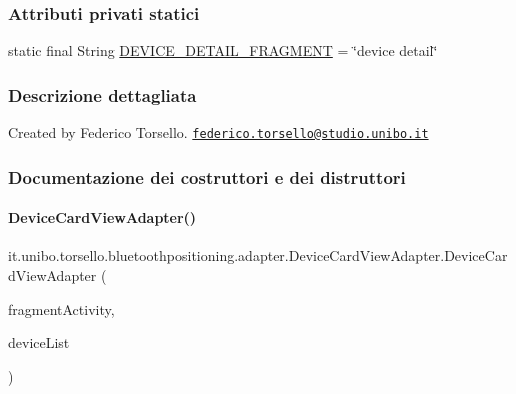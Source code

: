 \subsubsection*{Attributi privati statici}
\begin{DoxyCompactItemize}
\item 
static final String \hyperlink{classit_1_1unibo_1_1torsello_1_1bluetoothpositioning_1_1adapter_1_1DeviceCardViewAdapter_a0d362081de4afb44abc82197aa597a18_a0d362081de4afb44abc82197aa597a18}{D\+E\+V\+I\+C\+E\+\_\+\+D\+E\+T\+A\+I\+L\+\_\+\+F\+R\+A\+G\+M\+E\+NT} = \char`\"{}device detail\char`\"{}
\end{DoxyCompactItemize}


\subsubsection{Descrizione dettagliata}
Created by Federico Torsello. \href{mailto:federico.torsello@studio.unibo.it}{\tt federico.\+torsello@studio.\+unibo.\+it} 

\subsubsection{Documentazione dei costruttori e dei distruttori}
\hypertarget{classit_1_1unibo_1_1torsello_1_1bluetoothpositioning_1_1adapter_1_1DeviceCardViewAdapter_a5f15271cd20868ac66c3c0876adca536_a5f15271cd20868ac66c3c0876adca536}{}\label{classit_1_1unibo_1_1torsello_1_1bluetoothpositioning_1_1adapter_1_1DeviceCardViewAdapter_a5f15271cd20868ac66c3c0876adca536_a5f15271cd20868ac66c3c0876adca536} 
\paragraph{\texorpdfstring{Device\+Card\+View\+Adapter()}{DeviceCardViewAdapter()}}
{\footnotesize\ttfamily it.\+unibo.\+torsello.\+bluetoothpositioning.\+adapter.\+Device\+Card\+View\+Adapter.\+Device\+Card\+View\+Adapter (\begin{DoxyParamCaption}\item[{final Fragment\+Activity}]{fragment\+Activity,  }\item[{List$<$ \hyperlink{classit_1_1unibo_1_1torsello_1_1bluetoothpositioning_1_1model_1_1Device}{Device} $>$}]{device\+List }\end{DoxyParamCaption})}


